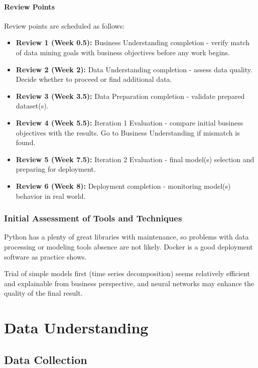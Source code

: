 \documentclass[oneside,final,12pt,a4paper]{extreport}
\begin{document}
\paragraph{Review Points}
\par Review points are scheduled as follows:
\begin{itemize}
    \item \textbf{Review 1 (Week 0.5):} Business Understanding completion - verify match of data mining goals with business objectives before any work begins.
    \item \textbf{Review 2 (Week 2):} Data Understanding completion - assess data quality. Decide whether to proceed or find additional data.
    \item \textbf{Review 3 (Week 3.5):} Data Preparation completion - validate prepared dataset(s).
    \item \textbf{Review 4 (Week 5.5):} Iteration 1 Evaluation - compare initial business objectives with the results. Go to Business Understanding if mismatch is found.
    \item \textbf{Review 5 (Week 7.5):} Iteration 2 Evaluation - final model(s) selection and preparing for deployment.
    \item \textbf{Review 6 (Week 8):} Deployment completion - monitoring model(s) behavior in real world. 
\end{itemize}


\subsubsection{Initial Assessment of Tools and Techniques}
\par Python has a plenty of great libraries with maintenance, so problems with data processing or modeling tools absence are not likely. Docker is a good deployment software as practice shows.
    \par Trial of simple models first (time series decomposition) seems relatively efficient and explainable from business perspective, and neural networks may enhance the quality of the final result.

\section{Data Understanding}
\subsection{Data Collection}
\end{document}
